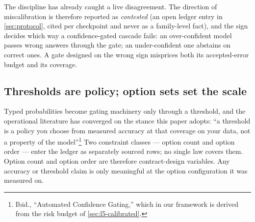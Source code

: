 The discipline has already caught a live disagreement.   The direction of miscalibration is therefore
reported as \emph{contested} (an open ledger entry in \cref{sec:protocol}, cited per checkpoint
and never as a family-level fact), and the sign decides which way a confidence-gated cascade
fails: an over-confident model passes wrong answers through the gate; an under-confident one
abstains on correct ones. A gate designed on the wrong sign misprices both its accepted-error
budget and its coverage.

\subsection{Thresholds are policy; option sets set the scale}
\label{sec:l4-thresholds}

Typed probabilities become gating machinery only through a threshold, and the operational
literature has converged on the stance this paper adopts: ``a threshold is a policy you choose
from measured accuracy at that coverage on your data, not a property of the model''\footnote{Ibid.,
``Automated Confidence Gating,'' which in our framework is derived from the risk budget of
\cref{sec:l5-calibrated}.} Two constraint classes --- option count and option order --- enter the
ledger as separately sourced rows; no single law covers them.    Option count and option order are
therefore contract-design variables. Any accuracy or threshold claim is only meaningful at the
option configuration it was measured on.

